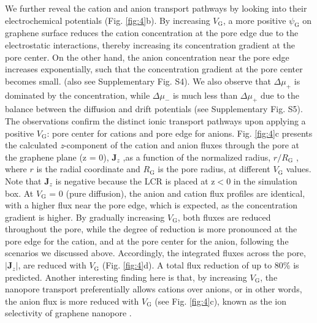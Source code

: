 \documentclass[journal=langd5,email=true, hyperref=true, keywords=false]{achemso}
\newcommand{\Fig}{Fig.}
\begin{document}
We further reveal the cation and anion transport pathways by looking
into their electrochemical potentials (\Fig{} \ref{fig:4}b). By
increasing $V_{\mathrm{G}}$, a more positive $\psi_{\mathrm{G}}$ on
graphene surface reduces the cation concentration at the pore edge due
to the electrostatic interactions, thereby increasing its
concentration gradient at the pore center. On the other hand, the
anion concentration near the pore edge increases exponentially, such
that the concentration gradient at the pore center becomes
small. (also see Supplementary \Fig{} S4). We also
observe that $\Delta \mu_{+}$ is dominated by the concentration, while
$\Delta \mu_{-}$ is much less than $\Delta \mu_{+}$ due to the balance
between the diffusion and drift potentials (see Supplementary \Fig{}
S5). The observations confirm the distinct ionic
transport pathways upon applying a positive $V_{\mathrm{G}}$: pore
center for cations and pore edge for anions. \Fig{} \ref{fig:4}c
presents the calculated \textit{z}-component of the cation and anion fluxes
through the pore at the graphene plane (z = 0), $\boldsymbol{J}_{z}$
,as a function of the normalized radius, $r/R_{\mathrm{G}}$ , where
$r$ is the radial coordinate and $R_{\mathrm{G}}$ is the pore radius,
at different $V_{\mathrm{G}}$ values. Note that $\boldsymbol{J}_{z}$
is negative because the LCR is placed at z$<$0 in the simulation box. At
$V_{\mathrm{G}}$ = 0 (pure diffusion), the anion and cation flux
profiles are identical, with a higher flux near the pore edge, which
is expected, as the concentration gradient is higher. By gradually
increasing $V_{\mathrm{G}}$, both fluxes are reduced throughout the
pore, while the degree of reduction is more pronounced at the pore
edge for the cation, and at the pore center for the anion, following
the scenarios we discussed above. Accordingly, the integrated fluxes
across the pore, $|\boldsymbol{J}_{z}|$, are reduced with
$V_{\mathrm{G}}$ (\Fig{} \ref{fig:4}d). A total flux reduction of up
to 80\% is predicted. Another interesting finding here is that, by
increasing $V_{\mathrm{G}}$, the nanopore transport preferentially
allows cations over anions, or in other words, the anion flux is more
reduced with $V_{\mathrm{G}}$ (see \Fig{} \ref{fig:4}c), known as the
ion selectivity of graphene nanopore \cite{Rollings_2016}.
\end{document}
